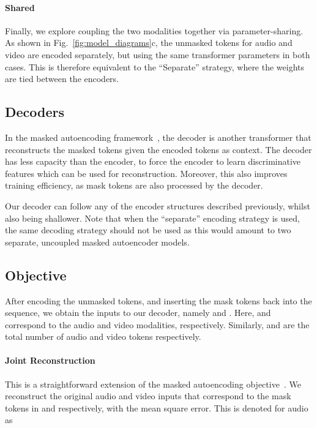 \documentclass[10pt,twocolumn,letterpaper]{article}
\def \paravspace {-1\baselineskip}
\begin{document}
\vspace{\paravspace}
\paragraph{Shared}
Finally, we explore coupling the two modalities together via parameter-sharing.
As shown in Fig.~\ref{fig:model_diagrams}c, the unmasked tokens for audio and video are encoded separately, but using the same transformer parameters in both cases.
This is therefore equivalent to the ``Separate'' strategy, where the weights are tied between the encoders.

\vspace{-0.15\baselineskip}
\subsection{Decoders}
\label{sec:method_decoders}
\vspace{-1mm}

In the masked autoencoding framework~\cite{he2022masked, feichtenhofer2022masked, bao2021beit}, the decoder is another transformer that reconstructs the masked tokens given the encoded tokens as context.
The decoder has less capacity than the encoder, to force the encoder to learn discriminative features which can be used for reconstruction. Moreover, this  also  improves training efficiency, as mask tokens are also processed by the decoder.

Our decoder can follow any of the encoder structures described previously, whilst also being shallower.
Note that when the ``separate'' encoding strategy is used, the same decoding strategy should not be used as this would amount to two separate, uncoupled masked autoencoder models.

\subsection{Objective} 
\label{sec:method_objective}
\vspace{-1mm}

After encoding the unmasked tokens, and inserting the mask tokens back into the sequence, we obtain the inputs to our decoder, namely  and .
Here,  and  correspond to the audio and video modalities, respectively.
Similarly,  and  are the total number of audio and video tokens respectively.

\vspace{\paravspace}
\paragraph{Joint Reconstruction}
This is a straightforward extension of the masked autoencoding objective~\cite{he2022masked}.
We reconstruct the original audio and video inputs that correspond to the mask tokens in  and  respectively, with the mean square error.
This is denoted for audio as
\vspace{-0.25\baselineskip}
\end{document}
